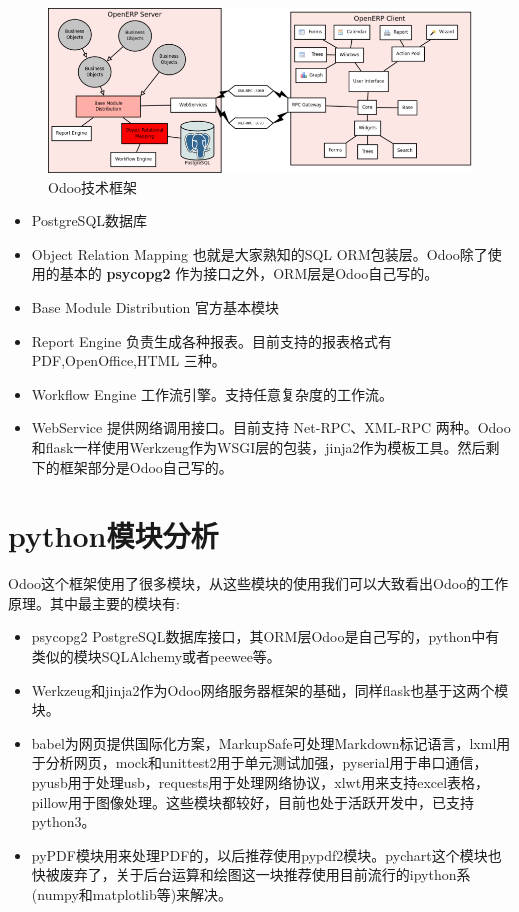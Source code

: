 \documentclass[11pt,a4paper]{sphinxmanual}
\begin{document}
\begin{figure}[H]
\centering
\includegraphics[keepaspectratio,max width=0.95\linewidth]{images/client_server.png}
\caption{Odoo技术框架}
\end{figure}

\begin{itemize}
\item PostgreSQL数据库

\item Object Relation Mapping 也就是大家熟知的SQL ORM包装层。Odoo除了使用的基本的 \textbf{psycopg2} 作为接口之外，ORM层是Odoo自己写的。

\item Base Module Distribution 官方基本模块

\item Report Engine 负责生成各种报表。目前支持的报表格式有 PDF,OpenOffice,HTML 三种。

\item Workflow Engine 工作流引擎。支持任意复杂度的工作流。

\item WebService 提供网络调用接口。目前支持 Net-RPC、XML-RPC 两种。Odoo和flask一样使用Werkzeug作为WSGI层的包装，jinja2作为模板工具。然后剩下的框架部分是Odoo自己写的。
\end{itemize}



\section{python模块分析}
\label{sec-2-1}
Odoo这个框架使用了很多模块，从这些模块的使用我们可以大致看出Odoo的工作原理。其中最主要的模块有: 

\begin{itemize}
\item psycopg2 PostgreSQL数据库接口，其ORM层Odoo是自己写的，python中有类似的模块SQLAlchemy或者peewee等。​

\item Werkzeug和jinja2作为Odoo网络服务器框架的基础，同样flask也基于这两个模块。​

\item babel为网页提供国际化方案，MarkupSafe可处理Markdown标记语言，lxml用于分析网页，mock和unittest2用于单元测试加强，pyserial用于串口通信，pyusb用于处理usb，requests用于处理网络协议，xlwt用来支持excel表格，pillow用于图像处理。这些模块都较好，目前也处于活跃开发中，已支持python3。​

\item pyPDF模块用来处理PDF的，以后推荐使用pypdf2模块。pychart这个模块也快被废弃了，关于后台运算和绘图这一块推荐使用目前流行的ipython系(numpy和matplotlib等)来解决。​
\end{itemize}
\end{document}
